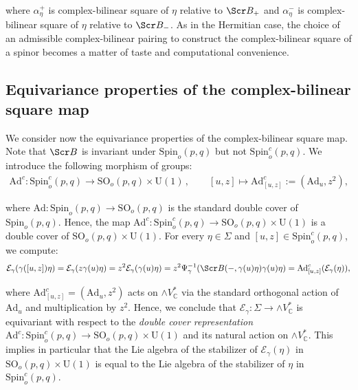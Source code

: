 \documentclass[10pt,a4paper,twoside,reqno]{amsart}
\theoremstyle{plain}
\theoremstyle{definition}
\theoremstyle{remark}
\def\C{\mathbb{C}}
\def\Ad{\mathrm{Ad}}
\def\scB{\Scr B}
\def\Spin{\mathrm{Spin}}
\def\Spin{\mathrm{Spin}}
\def\SO{\mathrm{SO}}
\def\U{\mathrm{U}}
\def\cE{\mathcal{E}}
\begin{document}
\noindent
where $\alpha_{\eta}^{+}$ is complex-bilinear square of $\eta$ relative to $\scB_{+}$ and $\alpha_{\eta}^{-}$ is complex-bilinear square of $\eta$ relative to $\scB_{-}$. As in the Hermitian case, the choice of an admissible complex-bilinear pairing to construct the complex-bilinear square of a spinor becomes a matter of taste and computational convenience.  


\subsection{Equivariance properties of the complex-bilinear square map}
\label{subsec:Bilinearequivariance}


We consider now the equivariance properties of the complex-bilinear square map. Note that $\scB$ is invariant under $\Spin_o(p,q)$ but not $\Spin_o^c(p,q)$. We introduce the following morphism of groups:
\begin{eqnarray*}
\Ad^c\colon \Spin_o^c(p,q) \to \SO_o(p,q) \times \U(1) \, , \qquad [u,z]\mapsto \Ad^c_{[u,z]} := (\Ad_u,z^2),
\end{eqnarray*}

\noindent
where $\Ad\colon \Spin_o(p,q) \to \SO_o(p,q)$ is the standard double cover of $\Spin_o(p,q)$. Hence, the map $\Ad^c\colon \Spin_o^c(p,q) \to \SO_o(p,q) \times \U(1)$ is a double cover of $\SO_o(p,q) \times \U(1)$. For every $\eta\in \Sigma$ and $[u,z] \in \Spin_o^c(p,q)$, we compute:
\begin{eqnarray*}
\cE_\gamma(\gamma([u,z])\eta) = \cE_\gamma (z\gamma(u)\eta) = z^2 \cE_\gamma ( \gamma(u)\eta) = z^2\Psi_{\gamma}^{-1}(\scB( - , \gamma(u)\eta) \gamma(u)\eta) = \Ad^c_{[u,z]}(\cE_\gamma (\eta)),
\end{eqnarray*}

\noindent
where $\Ad^c_{[u,z]} = (\Ad_u , z^2)$ acts on $\wedge V^{\ast}_\C$ via the standard orthogonal action of $\Ad_u$ and multiplication by $z^2$. Hence, we conclude that $\cE_\gamma \colon \Sigma \to \wedge V^*_\C$ is equivariant with respect to the  \emph{double cover representation} $\Ad^c \colon \Spin_o^c(p,q) \to \SO_o(p,q)\times \U(1)$ and its natural action on $\wedge V^*_\C$. This implies in particular that the Lie algebra of the stabilizer of $\cE_\gamma(\eta)$ in $\SO_o(p,q)\times \U(1)$ is equal to the Lie algebra of the stabilizer of $\eta$ in $\Spin^c_o(p,q)$.
\end{document}
